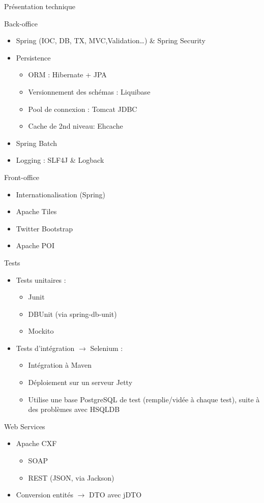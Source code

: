 \begin{frame}
	\begin{center}
		 \huge{Pr\'esentation technique}
	\end{center}
\end{frame}

\begin{frame}{Back-office}
	\begin{itemize}
		\item Spring (IOC, DB, TX, MVC,Validation\ldots) \& Spring Security
		\item Persistence
		\begin{itemize}
			\item ORM : Hibernate + JPA 
			\item Versionnement des sch\'emas : Liquibase
			\item Pool de connexion : Tomcat JDBC			
			\item Cache de 2nd niveau: Ehcache
		\end{itemize}
		\item Spring Batch
		\item Logging : SLF4J \& Logback
	\end{itemize}
\end{frame}

\begin{frame}{Front-office}	
	\begin{itemize}
		\item Internationalisation (Spring)
		\item Apache Tiles
		\item Twitter Bootstrap
		\item Apache POI
	\end{itemize}
\end{frame}

\begin{frame}{Tests}
	\begin{itemize}
		\item Tests unitaires : 
			\begin{itemize}
				\item Junit
				\item DBUnit (via spring-db-unit)
				\item Mockito
			\end{itemize}
		\item Tests d'int\'egration $\rightarrow$ Selenium :
			\begin{itemize}
				\item Int\'egration \`a Maven
				\item D\'eploiement sur un serveur Jetty
				\item Utilise une base PostgreSQL de test (remplie/vid\'ee \`a chaque test), suite \`a des probl\`emes avec HSQLDB
			\end{itemize}
	\end{itemize}
\end{frame}

\begin{frame}{Web Services}
	\begin{itemize}
		\item Apache CXF
		\begin{itemize}
			\item SOAP
			\item REST (JSON, via Jackson)
		\end{itemize}
		\item Conversion entit\'es $\rightarrow$ DTO avec jDTO
	\end{itemize}
\end{frame}

